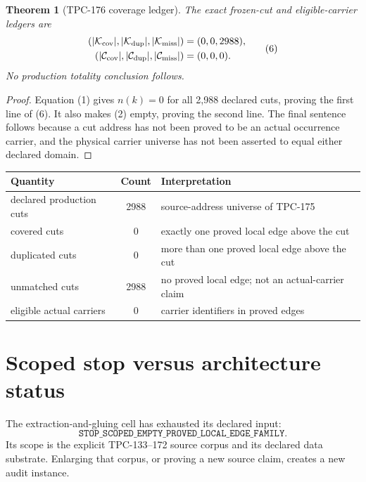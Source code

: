 \documentclass[11pt]{article}
\newtheorem{theorem}{Theorem}[section]
\theoremstyle{definition}
\theoremstyle{remark}
\begin{document}
\begin{theorem}[TPC-176 coverage ledger]
The exact frozen-cut and eligible-carrier ledgers are
\[
 \begin{aligned}
 (|\mathcal K_{\rm cov}|,|\mathcal K_{\rm dup}|,
   |\mathcal K_{\rm miss}|)&=(0,0,2988),\\
 (|\mathcal C_{\rm cov}|,|\mathcal C_{\rm dup}|,
   |\mathcal C_{\rm miss}|)&=(0,0,0).
 \end{aligned}                                                    \tag{6}
\]
No production totality conclusion follows.
\end{theorem}

\begin{proof}
Equation (1) gives \(n(k)=0\) for all 2,988 declared cuts, proving the
first line of (6).  It also makes (2) empty, proving the second line.
The final sentence follows because a cut address has not been proved
to be an actual occurrence carrier, and the physical carrier universe
has not been asserted to equal either declared domain.
\end{proof}

\begin{center}
\begin{tabularx}{0.96\linewidth}{@{}l c Y@{}}
\toprule
Quantity & Count & Interpretation\\
\midrule
declared production cuts & 2988 & source-address universe of TPC-175\\
covered cuts & 0 & exactly one proved local edge above the cut\\
duplicated cuts & 0 & more than one proved local edge above the cut\\
unmatched cuts & 2988 & no proved local edge; not an actual-carrier claim\\
eligible actual carriers & 0 & carrier identifiers in proved edges\\
\bottomrule
\end{tabularx}
\end{center}

\section{Scoped stop versus architecture status}

The extraction-and-gluing cell has exhausted its declared input:
\[
 \texttt{STOP\_SCOPED\_EMPTY\_PROVED\_LOCAL\_EDGE\_FAMILY}.        \tag{7}
\]
Its scope is the explicit TPC-133--172 source corpus and its declared
data substrate.  Enlarging that corpus, or proving a new source claim,
creates a new audit instance.
\end{document}
